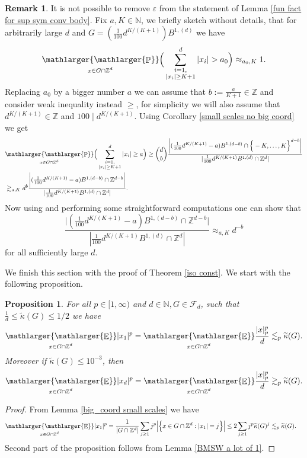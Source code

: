 \documentclass[a4paper,oneside, reqno]{amsart}
\numberwithin{equation}{section}
\newtheorem{Prop}[Thm]{Proposition}
\theoremstyle{definition}%
\newtheorem{Rem}[Thm]{Remark}
\theoremstyle{definition}
\theoremstyle{definition}%
\theoremstyle{definition}
\newcommand{\E}{\mathop{\mathbb{E}}}
\newcommand{\Pro}{\mathop{\mathbb{P}}}
\newcommand{\Z}{\mathbb{Z}}
\newcommand{\N}{\mathbb{N}}
\newcommand{\se}[1]{\underset{_{\substack{#1}}}{\mathlarger{\mathlarger{\E}}}}
\newcommand{\spr}[1]{\underset{_{\substack{#1}}}{\mathlarger{\mathlarger{\Pro}}}}
\begin{document}
\begin{Rem}
    It is not possible to remove $\varepsilon$ from the statement of Lemma \ref{fun fact for sup sym conv body}. Fix $a,K \in \N$, we briefly sketch without details, that for arbitrarily large $d$ and $G= (\frac{1}{100}d^{K/(K+1)}) B^{1,(d)}$ we have
    \[
    \spr{x \in G \cap \Z^d} \Big(\sum_{\substack{i=1, \\ |x_i| \ge K+1}}^d
|x_i| > a_0 \Big) \approx_{a_0,K} 1.
    \]
    Replacing $a_0$ by a bigger number $a$ we can assume that $b:=\frac{a}{K+1} \in \Z$ and consider weak inequality instead $\ge$, for simplicity we will also assume that $d^{K/(K+1)} \in \Z$ and $100 \mid d^{K/(K+1)}$. Using Corollary \ref{small scales no big coord} we get 
    \begin{align*}
        &\spr{x \in G \cap \Z^d} \Big(\sum_{\substack{i=1, \\ |x_i| \ge K+1}}^d
|x_i| \ge a \Big) \ge \binom{d}{b} \frac{ \bigg|(\frac{1}{100}d^{K/(K+1)}- a) B^{1,(d-b)} \cap \Big\{-K,\ldots, K\Big\}^{d-b}\bigg|}{|\frac{1}{100}d^{K/(K+1)}B^{1,(d)} \cap \Z^d|} \\
    &\gtrsim_{a,K} d^{b} \frac{ \bigg|(\frac{1}{100}d^{K/(K+1)}- a) B^{1,(d-b)} \cap \Z^{d-b}\bigg|}{|\frac{1}{100}d^{K/(K+1)}B^{1,(d)} \cap \Z^d|}. 
    \end{align*}
    Now using \cite[Theorem 1.4]{KNW} and performing some straightforward computations one can show that 
    \[
    \frac{ \bigg|(\frac{1}{100}d^{K/(K+1)}- a) B^{1,(d-b)} \cap \Z^{d-b}\bigg|}{|\frac{1}{100}d^{K/(K+1)}B^{1,(d)} \cap \Z^d|} \approx_{a,K} d^{-b}
    \]
    for all sufficiently large $d$.
\end{Rem}
We finish this section with the proof of Theorem \ref{iso const}. We start with the following proposition.
\begin{Prop} \label{concen small}
     For all $p \in [1,\infty)$ and $d \in \N, G \in \mathcal{F}_d$, such that $\frac{1}{d} \le \widetilde{\kappa}(G) \le 1/2$ we have
    \[
    \se{x \in G \cap \Z^d} |x_1|^p= \se{x \in G \cap \Z^d} \frac{|x|_p^p}{d} \lesssim_{p} \widetilde{\kappa}(G).
    \]
    Moreover if $\widetilde{\kappa}(G) \le 10^{-3}$, then
    \[
    \se{x \in G \cap \Z^d} |x_d|^p= \se{x \in G \cap \Z^d} \frac{|x|_p^p}{d} \gtrsim_{p} \widetilde{\kappa}(G).
    \]
\end{Prop}
\begin{proof}
    From Lemma \ref{big_coord small scales} we have
    \begin{align*}
        &\se{x \in G \cap \Z^d} |x_1|^p= \frac{1}{|G \cap \Z^d|} \sum_{j \ge 1} j^p \Big|\Big\{ x \in G \cap \Z^d: |x_1|=j \Big\}\Big| \le 2 \sum_{j \ge 1} j^p \widetilde{\kappa}(G)^j \lesssim_p \widetilde{\kappa}(G).
    \end{align*}
    Second part of the proposition follows from Lemma \ref{BMSW a lot of 1}.
\end{proof}
\end{document}
